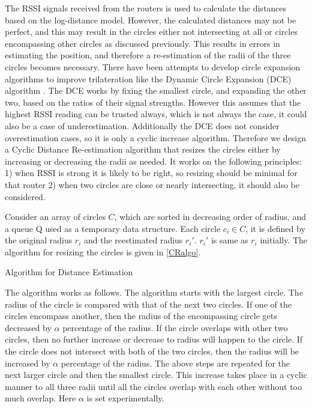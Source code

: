\documentclass[twocolumn, 11pt]{IEEEtran}
\begin{document}
The RSSI signals received from the routers is used to calculate the distances based on the log-distance model. However, the calculated distances may not be perfect, and this may result in the circles either not intersecting at all or circles encompassing other circles as discussed previously. This results in errors in estimating the position, and therefore a re-estimation of the radii of the three circles becomes necessary. There have been attempts to develop circle expansion algorithms to improve trilateration like the Dynamic Circle Expansion (DCE) algorithm \cite{DCE}. The DCE works by fixing the smallest circle, and expanding the other two, based on the ratios of their signal strengths. However this assumes that the highest RSSI reading can be trusted always, which is not always the case, it could also be a case of underestimation. Additionally the DCE does not consider overestimation cases, so it is only a cyclic increase algorithm. Therefore we design a Cyclic Distance Re-estimation algorithm that resizes the circles either by increasing or decreasing the radii as needed. It works on the following principles: 1) when RSSI is strong it is likely to be right, so resizing should be minimal for that router 2) when two circles are close or nearly intersecting, it should also be considered.

Consider an array of circles $C$, which are sorted in decreasing order of radius, and a queue Q used as a temporary data structure. Each circle $c_i \in C$, it is defined by the original radius $r_i$ and the reestimated radius $r_i'$.  $r_i'$ is same as  $r_i$ initially. The algorithm for resizing the circles is given in \ref{CRalgo}. 

\begin{algorithm}
\SetAlgoLined
{}
\caption{Algorithm for Distance Estimation}
\label{CRalgo}
\end{algorithm}

The algorithm works as follows. The algorithm starts with the largest circle. The radius of the circle is compared with that of the next two circles. If one of the circles encompass another, then the radius of the encompassing circle gets decreased by $\alpha$ percentage of the radius. If the circle overlaps with other two circles, then no further increase or decrease to radius will happen to the circle. If the circle does not intersect with both of the two circles, then the radius will be increased by $\alpha$ percentage of the radius. The above steps are repeated for the next larger circle and then the smallest circle. This increase takes place in a cyclic manner to all three radii until all the circles overlap with each other without too much overlap. Here $\alpha$ is set experimentally. 
\end{document}
